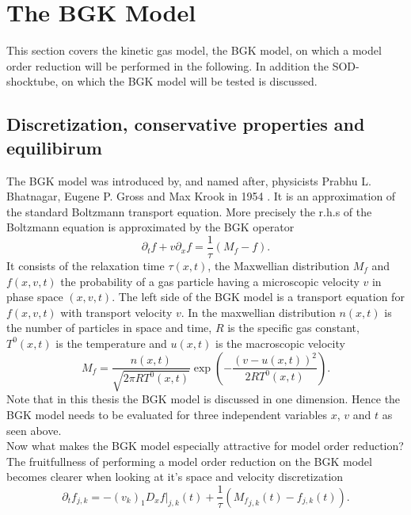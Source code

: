 

\chapter{The BGK Model}
\label{Ch:BGK}




This section covers the kinetic gas model, the BGK model, on which a model order reduction will be performed in the following. In addition the SOD-shocktube, on which the BGK model will be tested is discussed.\\
\section{Discretization, conservative properties and equilibirum}
The BGK model was introduced by, and named after, physicists Prabhu L. Bhatnagar, Eugene P. Gross and Max Krook in 1954 \cite{BGK}. It is an approximation of the standard Boltzmann transport equation. More precisely the r.h.s of the Boltzmann equation is approximated by the BGK operator \cite{puppo2019kinetic}
\begin{equation}
\partial_t f + v \partial_x f = \frac{1}{\tau} (M_f - f) \text{.}
\label{Eq:BGK}
\end{equation}
It consists of the relaxation time \(\tau(x,t)\), the Maxwellian distribution \(M_f\) and \(f(x,v,t)\) the probability of a gas particle having a microscopic velocity \(v\) in phase space \((x,v,t)\). The left side of the BGK model is a transport equation for \(f(x,v,t)\) with transport velocity \(v\). In the maxwellian distribution \(n(x,t)\) is the number of particles in space and time, \(R\) is the specific gas constant, \(T^0(x,t)\) is the temperature and \(u(x,t)\) is the macroscopic velocity
\begin{equation}
M_f = \frac{n(x,t)}{\sqrt{2\pi R T^0(x,t)}}\exp(-\frac{(v - u(x,t))^2}{2 R T^0(x,t)}) \text{.}
\end{equation}
Note that in this thesis the BGK model is discussed in one dimension. Hence the BGK model needs to be evaluated for three independent variables \(x\), \(v\) and \(t\) as seen above.\\ 
Now what makes the BGK model especially attractive for model order reduction?
The fruitfullness of performing a model order reduction on the BGK model becomes clearer when looking at it's space and velocity discretization
\begin{equation}
	\partial_t f_{j,k} = -(v_k)_1D_x f|_{j,k}(t) + \frac{1}{\tau}({M_f}_{j,k}(t) - f_{j,k}(t)) \text{.}
	\label{Eq:Discrete BGK}
\end{equation}
